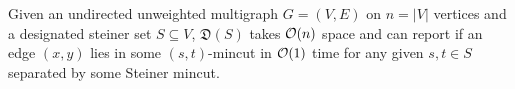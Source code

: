\begin{lemma}
\label{lem:path-intersects-tree}
Given an undirected unweighted multigraph $G=(V,E)$ on $n=|V|$ vertices and a designated steiner set $S\subseteq V$, $\mathfrak{D}(S)$ takes ${\cal O}(n)$ space and can report if an edge $(x,y)$ lies in some $(s,t)$-mincut in ${\cal O}(1)$ time for any given $s,t \in S$ separated by some Steiner mincut.
\end{lemma}
